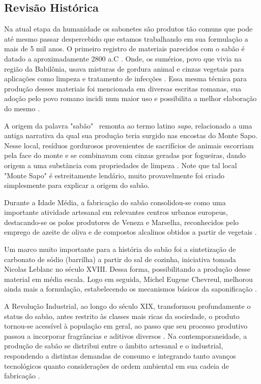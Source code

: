\subsection{Revisão Histórica}

Na atual etapa da humanidade os sabonetes são produtos tão comuns que pode até mesmo passar despercebido que estamos trabalhando em sua formulação a mais de 5 mil anos. O primeiro registro de materiais parecidos com o sabão é datado a aproximadamente 2800 a.C \cite{fogaca_historia_sabao}. Onde, os sumérios, povo que vivia na região da Babilônia, usava misturas de gordura animal e cinzas vegetais para aplicações como limpeza e tratamento de infecções \cite{rittner1995sabao}. Essa mesma técnica para produção desses materiais foi mencionada em diversas escritas romanas, sua adoção pelo povo romano incidi num maior uso e possibilita a melhor elaboração do mesmo \cite{barbosa1995xampus}.

A origem da palavra "sabão" ~remonta ao termo latino \textit{sapo}, relacionado a uma antiga narrativa da qual sua produção teria surgido nas encostas do Monte Sapo. Nesse local, resíduos gordurosos provenientes de sacrifícios de animais escorriam pela face do monte e se combinavam com cinzas geradas por fogueiras, dando origem a uma substância com propriedades de limpeza \cite{shreve1984chemical}. Note que tal local  "Monte Sapo" é estreitamente lendário, muito provavelmente foi criado simplesmente para explicar a origem
do sabão. 

Durante a Idade Média, a fabricação do sabão consolidou-se como uma importante atividade artesanal em relevantes centros urbanos europeus, destacando-se os polos produtores de Veneza e Marselha, reconhecidos pelo emprego de azeite de oliva e de compostos alcalinos obtidos a partir de vegetais \cite{rittner1995sabao}.

Um marco muito importante para a história do sabão foi a sintetização de carbonato de sódio (barrilha) a partir do sal de cozinha, iniciativa tomada Nicolas Leblanc no século XVIII. Dessa forma, possibilitando a produção desse material em média escala. Logo em seguida, Michel Eugene Chevreul, melhorou ainda mais a formulação, estabelecendo os mecanismos básicos da saponificação \cite{selinger1986chemistry}.

A Revolução Industrial, ao longo do século XIX, transformou profundamente o status do sabão, antes restrito  às classes mais ricas da sociedade, o produto tornou-se acessível à população em geral, ao passo que seu processo produtivo passou a incorporar fragrâncias e aditivos diversos \cite{rittner1995sabao}. Na contemporaneidade, a produção de sabão se distribui entre o âmbito artesanal e o industrial, respondendo a distintas demandas de consumo e integrando tanto avanços tecnológicos quanto considerações de ordem ambiental em sua cadeia de fabricação \cite{castro2020producao}.